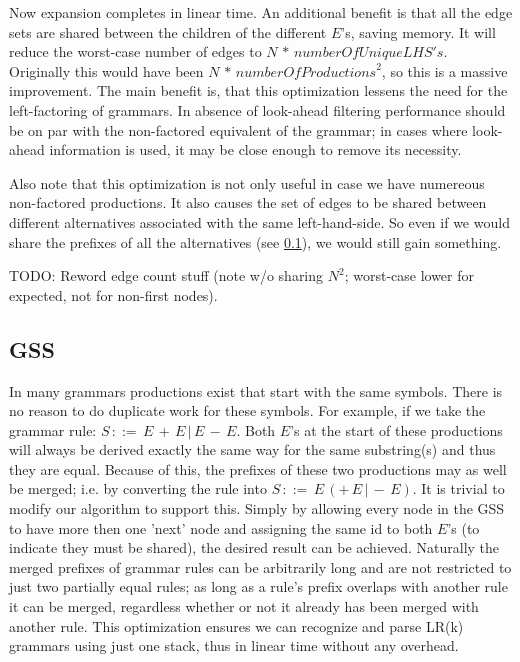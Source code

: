 \documentclass[a4paper,10pt]{article}
\begin{document}
Now expansion completes in linear time. An additional benefit is that all the edge sets are shared between the children of the different $E$'s, saving memory. It will reduce the worst-case number of edges to $N\,*\,\mathit{numberOfUniqueLHS's}$. Originally this would have been $N\,*\,\mathit{numberOfProductions}^2$, so this is a massive improvement. The main benefit is, that this optimization lessens the need for the left-factoring of grammars. In absence of look-ahead filtering performance should be on par with the non-factored equivalent of the grammar; in cases where look-ahead information is used, it may be close enough to remove its necessity.

Also note that this optimization is not only useful in case we have numereous non-factored productions. It also causes the set of edges to be shared between different alternatives associated with the same left-hand-side. So even if we would share the prefixes of all the alternatives (see \ref{sec:prefixSharing}), we would still gain something.

TODO: Reword edge count stuff (note w/o sharing $N^2$; worst-case lower for expected, not for non-first nodes).

\subsection{GSS}
\label{sec:prefixSharing}

In many grammars productions exist that start with the same symbols. There is no reason to do duplicate work for these symbols. For example, if we take the grammar rule: $S\,::=\,E\,+\,E\,|\,E\,-\,E$. Both $E$'s at the start of these productions will always be derived exactly the same way for the same substring(s) and thus they are equal. Because of this, the prefixes of these two productions may as well be merged; i.e. by converting the rule into $S\,::=\,E\,(+\,E\,|\,-\,E)$. It is trivial to modify our algorithm to support this. Simply by allowing every node in the GSS to have more then one 'next' node and assigning the same id to both $E$'s (to indicate they must be shared), the desired result can be achieved. Naturally the merged prefixes of grammar rules can be arbitrarily long and are not restricted to just two partially equal rules; as long as a rule's prefix overlaps with another rule it can be merged, regardless whether or not it already has been merged with another rule. This optimization ensures we can recognize and parse LR(k) grammars using just one stack, thus in linear time without any overhead.
\end{document}
